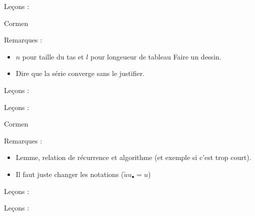 \documentclass[../Agregation.tex]{subfiles}
\begin{document}

Leçons :
\begin{itemize}
\end{itemize}
Cormen

Remarques :
\begin{itemize}
	\item $n$ pour taille du tas et $l$ pour longeueur de tableau
Faire un dessin.
	\item Dire que la série converge sans le justifier.
\end{itemize}

Leçons :
\begin{itemize}
\end{itemize}

Leçons :
\begin{itemize}
\end{itemize}

Cormen

Remarques :
\begin{itemize}
	\item Lemme, relation de récurrence et algorithme (et exemple si c'est trop court).
	\item Il faut juste changer les notations ($\widetilde{u}u_\bullet=u$)
\end{itemize}


Leçons :
\begin{itemize}
\end{itemize}


Leçons :
\begin{itemize}
\end{itemize}
\end{document}

